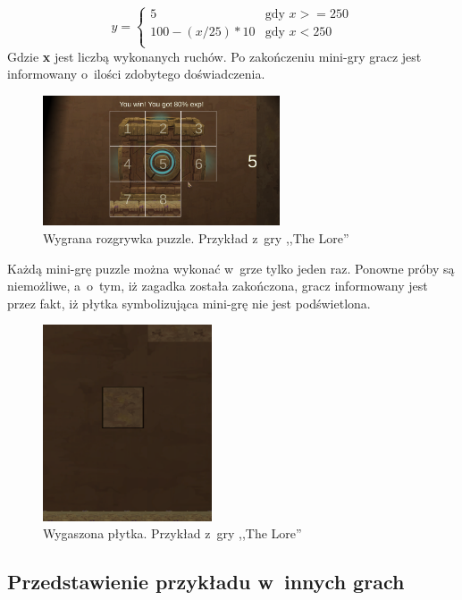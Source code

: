 \documentclass[oneside,polski,logo]{amuthesis}
\begin{document}
$$
y = \left\{ \begin{array}{ll}
5 & \textrm{gdy $x>=250$}\\
100 - (x / 25) * 10 & \textrm{gdy $x<250$}\\
\end{array} \right.
$$
Gdzie \textbf{x} jest liczbą wykonanych ruchów.
Po zakończeniu mini-gry gracz jest informowany o~ilości zdobytego doświadczenia.
\begin{figure}[h]
	\centering
	\includegraphics[width=7cm]{images/tyrek/puzzle_end.png}
	\caption{Wygrana rozgrywka puzzle. Przykład z~gry ,,The Lore''}
\end{figure}

Każdą mini-grę puzzle można wykonać w~grze tylko jeden raz. Ponowne próby są niemożliwe, a~o~tym, iż zagadka została zakończona, gracz informowany jest przez fakt, iż płytka symbolizująca mini-grę nie jest podświetlona.

\begin{figure}[h]
	\centering
	\includegraphics[width=5cm]{images/tyrek/puzzleWin.png}
	\caption{Wygaszona płytka. Przykład z~gry ,,The Lore''}
\end{figure}


\subsection{Przedstawienie przykładu w~innych grach}
\end{document}
